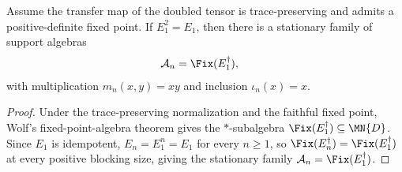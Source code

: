 \begin{lemma}%
    \label{thm:mpdo_blocked_fixed_point_algebra_tower_from_zcl}
    \leanok
    Assume the transfer map of the doubled tensor is trace-preserving and
    admits a positive-definite fixed point. If $E_1^2 = E_1$, then there is a
    stationary family of support algebras
    \begin{align}
        \mathcal{A}_n & = \Fix(E_1^{\dagger}),
        \notag
    \end{align}
    with multiplication $m_n(x,y) = xy$ and inclusion $\iota_n(x) = x$.
\end{lemma}
\begin{proof}\leanok
    Under the trace-preserving normalization and the faithful fixed point, Wolf's
    fixed-point-algebra theorem gives the $*$-subalgebra
    $\Fix(E_1^{\dagger}) \subseteq \MN{D}$. Since $E_1$ is
    idempotent, $E_n = E_1^n = E_1$ for every $n \ge 1$, so
    $\Fix(E_n^{\dagger}) = \Fix(E_1^{\dagger})$ at every
    positive blocking size, giving the stationary family
    $\mathcal{A}_n = \Fix(E_1^{\dagger})$.
\end{proof}

